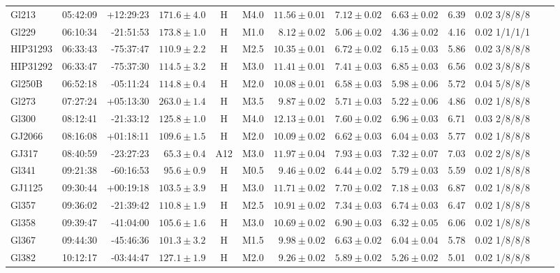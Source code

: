 \documentclass{aa}
\begin{document}
\begin{table}[h!]
{\begin{tabular}{ l r r r c c r r r r r r r}
Gl213 & 05:42:09 & +12:29:23 & $171.6 \pm  4.0$ & H & M4.0 &  $11.56 \pm 0.01$ & $7.12 \pm 0.02$ & $6.63 \pm 0.02$ & 6.39 & 0.02 3/8/8/8 \\
Gl229 & 06:10:34 & -21:51:53 & $173.8 \pm  1.0$ & H & M1.0 &  $8.12 \pm 0.02$ & $5.06 \pm 0.02$ & $4.36 \pm 0.02$ & 4.16 & 0.02 1/1/1/1 \\
HIP31293 & 06:33:43 & -75:37:47 & $110.9 \pm  2.2$ & H & M2.5 &  $10.35 \pm 0.01$ & $6.72 \pm 0.02$ & $6.15 \pm 0.03$ & 5.86 & 0.02 3/8/8/8 \\
HIP31292 & 06:33:47 & -75:37:30 & $114.5 \pm  3.2$ & H & M3.0 &  $11.41 \pm 0.01$ & $7.41 \pm 0.03$ & $6.85 \pm 0.03$ & 6.56 & 0.02 3/8/8/8 \\
Gl250B & 06:52:18 & -05:11:24 & $114.8 \pm  0.4$ & H & M2.0 &  $10.08 \pm 0.01$ & $6.58 \pm 0.03$ & $5.98 \pm 0.06$ & 5.72 & 0.04 5/8/8/8 \\
Gl273 & 07:27:24 & +05:13:30 & $263.0 \pm  1.4$ & H & M3.5 &  $9.87 \pm 0.02$ & $5.71 \pm 0.03$ & $5.22 \pm 0.06$ & 4.86 & 0.02 1/8/8/8 \\
Gl300 & 08:12:41 & -21:33:12 & $125.8 \pm  1.0$ & H & M4.0 &  $12.13 \pm 0.01$ & $7.60 \pm 0.02$ & $6.96 \pm 0.03$ & 6.71 & 0.03 2/8/8/8 \\
GJ2066 & 08:16:08 & +01:18:11 & $109.6 \pm  1.5$ & H & M2.0 &  $10.09 \pm 0.02$ & $6.62 \pm 0.03$ & $6.04 \pm 0.03$ & 5.77 & 0.02 1/8/8/8 \\
GJ317 & 08:40:59 & -23:27:23 & $65.3 \pm  0.4$ & A12 & M3.0 &  $11.97 \pm 0.04$ & $7.93 \pm 0.03$ & $7.32 \pm 0.07$ & 7.03 & 0.02 2/8/8/8 \\
Gl341 & 09:21:38 & -60:16:53 & $95.6 \pm  0.9$ & H & M0.5 &  $9.46 \pm 0.02$ & $6.44 \pm 0.02$ & $5.79 \pm 0.03$ & 5.59 & 0.02 1/8/8/8 \\
GJ1125 & 09:30:44 & +00:19:18 & $103.5 \pm  3.9$ & H & M3.0 &  $11.71 \pm 0.02$ & $7.70 \pm 0.02$ & $7.18 \pm 0.03$ & 6.87 & 0.02 1/8/8/8 \\
Gl357 & 09:36:02 & -21:39:42 & $110.8 \pm  1.9$ & H & M2.5 &  $10.91 \pm 0.02$ & $7.34 \pm 0.03$ & $6.74 \pm 0.03$ & 6.47 & 0.02 1/8/8/8 \\
Gl358 & 09:39:47 & -41:04:00 & $105.6 \pm  1.6$ & H & M3.0 &  $10.69 \pm 0.02$ & $6.90 \pm 0.03$ & $6.32 \pm 0.05$ & 6.06 & 0.02 1/8/8/8 \\
Gl367 & 09:44:30 & -45:46:36 & $101.3 \pm  3.2$ & H & M1.5 &  $9.98 \pm 0.02$ & $6.63 \pm 0.02$ & $6.04 \pm 0.04$ & 5.78 & 0.02 1/8/8/8 \\
Gl382 & 10:12:17 & -03:44:47 & $127.1 \pm  1.9$ & H & M2.0 &  $9.26 \pm 0.02$ & $5.89 \pm 0.02$ & $5.26 \pm 0.02$ & 5.01 & 0.02 1/8/8/8 \\

\end{tabular}}
\end{table}
\end{document}
